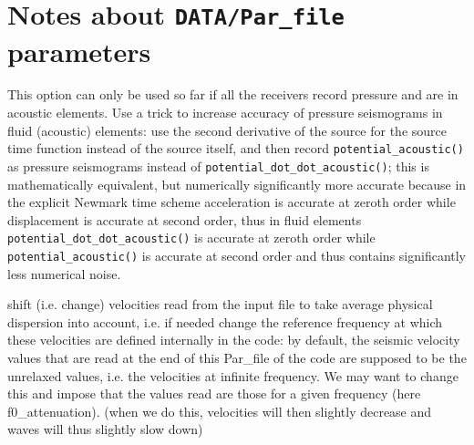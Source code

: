 \documentclass[oneside,english,onecolumn,letterpaper]{book}
\begin{document}
\section*{Notes about \texttt{DATA/Par\_file} parameters}

\begin{description}[font=\ttfamily]

\item[USE\_TRICK\_FOR\_BETTER\_PRESSURE] 

This option can only be used so far if all the receivers record pressure and are in acoustic elements.  
Use a trick to increase accuracy of pressure seismograms in fluid (acoustic) elements:
use the second derivative of the source for the source time function instead of the source itself,
and then record \texttt{potential\_acoustic()} as pressure seismograms instead of \texttt{potential\_dot\_dot\_acoustic()};
this is mathematically equivalent, but numerically significantly more accurate because in the explicit
Newmark time scheme acceleration is accurate at zeroth order while displacement is accurate at second order,
thus in fluid elements \texttt{potential\_dot\_dot\_acoustic()} is accurate at zeroth order while \texttt{potential\_acoustic()}
is accurate at second order and thus contains significantly less numerical noise.


\item[READ\_VELOCITIES\_AT\_f0]

 shift (i.e. change) velocities read from the input file to take average physical dispersion into account, i.e. if needed change the reference frequency at which these velocities are defined internally in the code: by default, the seismic velocity values that are read at the end of this Par\_file of the code are supposed to be the unrelaxed values, i.e. the velocities at infinite frequency. We may want to change this and impose that the values read are those for a given frequency (here f0\_attenuation). (when we do this, velocities will then slightly decrease and waves will thus slightly slow down)





\end{description}
\end{document}
